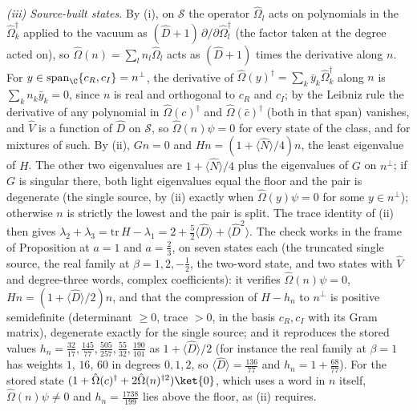 \emph{(iii) Source-built states.} By (i), on $\mathcal{S}$ the operator $\hat\Omega_{l}$ acts on polynomials in the $\hat\Omega_{k}^{\dagger}$ applied to the vacuum as $(\hat{D} + 1)\,\partial/\partial\hat\Omega_{l}^{\dagger}$ (the factor taken at the degree acted on), so $\hat\Omega(n) = \sum_{l}n_{l}\hat\Omega_{l}$ acts as $(\hat{D} + 1)$ times the derivative along $n$. For $y \in \mathrm{span}_{\C}\{c_{R}, c_{I}\} = n^{\perp}$, the derivative of $\hat\Omega(y)^{\dagger} = \sum_{k}\bar{y}_{k}\hat\Omega_{k}^{\dagger}$ along $n$ is $\sum_{k}n_{k}\bar{y}_{k} = 0$, since $n$ is real and orthogonal to $c_{R}$ and $c_{I}$; by the Leibniz rule the derivative of any polynomial in $\hat\Omega(c)^{\dagger}$ and $\hat\Omega(\bar{c})^{\dagger}$ (both in that span) vanishes, and $\hat{V}$ is a function of $\hat{D}$ on $\mathcal{S}$, so $\hat\Omega(n)\psi = 0$ for every state of the class, and for mixtures of such. By (ii), $Gn = 0$ and $Hn = (1 + \langle\hat{N}\rangle/4)n$, the least eigenvalue of $H$. The other two eigenvalues are $1 + \langle\hat{N}\rangle/4$ plus the eigenvalues of $G$ on $n^{\perp}$; if $G$ is singular there, both light eigenvalues equal the floor and the pair is degenerate (the single source, by (ii) exactly when $\hat\Omega(y)\psi = 0$ for some $y \in n^{\perp}$); otherwise $n$ is strictly the lowest and the pair is split. The trace identity of (ii) then gives $\lambda_{2} + \lambda_{3} = \mathrm{tr}\,H - \lambda_{1} = 2 + \tfrac52\langle\hat{D}\rangle + \langle\hat{D}^{2}\rangle$. The check works in the frame of Proposition  at $a = 1$ and $a = \tfrac23$, on seven states each (the truncated single source, the real family at $\beta = 1, 2, -\tfrac12$, the two-word state, and two states with $\hat{V}$ and degree-three words, complex coefficients): it verifies $\hat\Omega(n)\psi = 0$, $Hn = (1 + \langle\hat{D}\rangle/2)n$, and that the compression of $H - h_{n}$ to $n^{\perp}$ is positive semidefinite (determinant $\ge 0$, trace $> 0$, in the basis $c_{R}, c_{I}$ with its Gram matrix), degenerate exactly for the single source; and it reproduces the stored values $h_{n} = \tfrac{32}{17}, \tfrac{145}{77}, \tfrac{505}{257}, \tfrac{55}{32}, \tfrac{190}{101}$ as $1 + \langle\hat{D}\rangle/2$ (for instance the real family at $\beta = 1$ has weights $1$, $16$, $60$ in degrees $0, 1, 2$, so $\langle\hat{D}\rangle = \tfrac{136}{77}$ and $h_{n} = 1 + \tfrac{68}{77}$). For the stored state $(1 + \hat\Omega(c)^{\dagger} + 2\hat\Omega(n)^{\dagger 2})\ket{0}$, which uses a word in $n$ itself, $\hat\Omega(n)\psi \ne 0$ and $h_{n} = \tfrac{1738}{199}$ lies above the floor, as (ii) requires.

